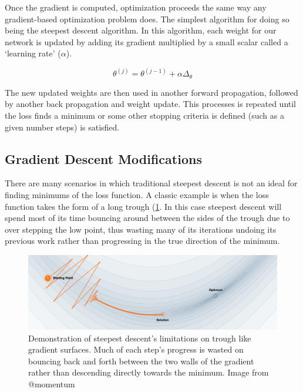 \documentclass[]{book}
\theoremstyle{definition}
\theoremstyle{definition}
\theoremstyle{definition}
\theoremstyle{remark}
\begin{document}
Once the gradient is computed, optimization proceeds the same way any
gradient-based optimization problem does. The simplest algorithm for
doing so being the steepest descent algorithm. In this algorithm, each
weight for our network is updated by adding its gradient multiplied by a
small scalar called a `learning rate' (\(\alpha\)).

\[\theta^{(j)} = \theta^{(j - 1)} + \alpha\Delta_{\theta}\]

The new updated weights are then used in another forward propagation,
followed by another back propagation and weight update. This processes
is repeated until the loss finds a minimum or some other stopping
criteria is defined (such as a given number steps) is satisfied.

\subsection{Gradient Descent
Modifications}\label{gradient-descent-modifications}

There are many scenarios in which traditional steepest descent is not an
ideal for finding minimums of the loss function. A classic example is
when the loss function takes the form of a long trough
(\ref{fig:badloss}. In this case steepest descent will spend most of its
time bouncing around between the sides of the trough due to over
stepping the low point, thus wasting many of its iterations undoing its
previous work rather than progressing in the true direction of the
minimum.

\begin{figure}

{\centering \includegraphics[width=1\linewidth]{figures/needs_momentum} 

}

\caption{Demonstration of steepest descent's limitations on trough like gradient surfaces. Much of each step's progress is wasted on bouncing back and forth between the two walls of the gradient rather than descending directly towards the minimum. Image from @momentum}\label{fig:badloss}
\end{figure}
\end{document}
